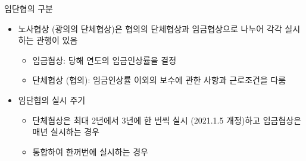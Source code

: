 \documentclass[aspectratio=169,xcolor=dvipsnames,handout]{beamer}
\begin{document}
\begin{frame}{임단협의 구분}
    \begin{itemize}[<+->]
        \item 노사협상 (광의의 단체협상)은 협의의 단체협상과 임금협상으로 나누어 각각 실시하는 관행이 있음
        \begin{itemize}[<+->]
            \item 임금협상: 당해 연도의 임금인상률을 결정
            \item 단체협상 (협의): 임금인상률 이외의 보수에 관한 사항과 근로조건을 다룸
        \end{itemize}
    \item 임단협의 실시 주기
        \begin{itemize}[<+->]
            \item 단체협상은 최대 2년에서 3년에 한 번씩 실시 (2021.1.5 개정)하고 임금협상은 매년 실시하는 경우
            \item 통합하여 한꺼번에 실시하는 경우
        \end{itemize}
    \end{itemize}
\end{frame}
\end{document}
